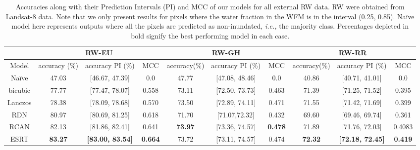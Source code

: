 \begin{table*}[!ht]
\vspace*{0.52cm}
\centering
\caption{\label{tab:ExternalResults} Accuracies along with their Prediction Intervals (PI) and \Acf{MCC} of our models for all external \Acf{RW} data. \Acf{RW} were obtained from Landsat-8 data. Note that we only present results for pixels where the water fraction in the \ac{WFM} is in the interval (0.25, 0.85). Na\"ive model here represents outputs where all the pixels are predicted as non-inundated, \textit{i.e.,} the majority class. Percentages depicted in bold signify the best performing model in each case.}
\vspace*{0.25cm}
\begin{tabular}{@{}cccccccccc@{}}
\toprule
        & \multicolumn{3}{c}{RW-EU}                         & \multicolumn{3}{c}{RW-GH}                        & \multicolumn{3}{c}{RW-RR}                          \\ \midrule
Model   & accuracy (\%) & accuracy PI (\%) & MCC                     & accuracy(\%)  & accuracy PI (\%) & MCC                        & accuracy(\%) & accuracy PI (\%)  & MCC                          \\ \midrule
Na\"ive & 47.03    & [46.67, 47.39]      & 0.0             & 47.77    & [47.08, 48.46]      & 0.0            & 40.86     &   [40.71, 41.01]   & 0.0                  \\
bicubic & 77.77    & [77.47, 78.07]      & 0.558                & 73.11    & [72.50, 73.73]      & 0.463                  & 71.39    &  [71.25, 71.52]      & 0.395             \\
Lanczos & 78.38    & [78.09, 78.68]      & 0.570                   & 73.50     & [72.89, 74.11]     & 0.471                  & 71.55   & [71.42, 71.69]       & 0.399             \\
RDN     & 80.97    & [80.69, 81.25]      & 0.618                   & 71.70     & [71.07,72.32]     & 0.432                   & 69.60    & [69.46, 69.74]       & 0.361           \\
RCAN    & 82.13    & [81.86, 82.41]      & 0.641                  & \textbf{73.97}     & [73.36, 74.57]     & \textbf{0.478}                & 71.89   & [71.76, 72.03]        & 0.4083                   \\
ESRT    & \textbf{83.27} & \textbf{[83.00, 83.54]}& \textbf{0.664}  &  73.72 & [73.11, 74.57]& 0.474  & \textbf{72.32} &\textbf{[72.18, 72.45]} & \textbf{0.419}  \\ \bottomrule
\end{tabular}
\end{table*}




